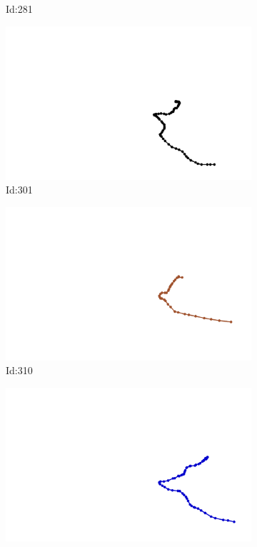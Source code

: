 \documentclass[12pt,twoside]{report}
\begin{document}
\begin{figure}
\begin{subfigure}[b]{0.20\textwidth}
\caption{Id:281}
\end{subfigure}
\begin{subfigure}[b]{0.20\textwidth}
\centering
\includegraphics[width=\textwidth]{../trajectories/301.png}
\caption{Id:301}
\end{subfigure}
\begin{subfigure}[b]{0.20\textwidth}
\centering
\includegraphics[width=\textwidth]{../trajectories/310.png}
\caption{Id:310}
\end{subfigure}
\begin{subfigure}[b]{0.20\textwidth}
\centering
\includegraphics[width=\textwidth]{../trajectories/319.png}

\end{subfigure}
\end{figure}
\end{document}
